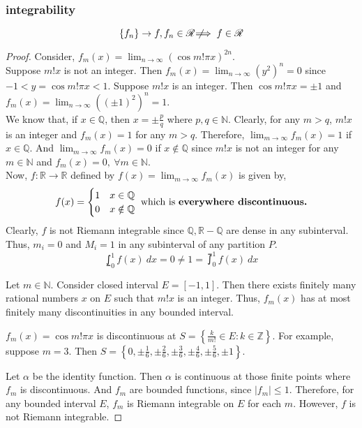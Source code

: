 \subsubsection{integrability} 
\[ \left\{f_n\right\} \to f, f_n \in \mathscr{R} \not\!\!\!\implies f \in \mathscr{R} \]
\begin{proof}
Consider, $\displaystyle f_m(x) = \lim_{n \to \infty} (\cos m!\pi x)^{2n}$.\\

Suppose $m!x$ is not an integer.
Then $\displaystyle f_m(x) = \lim_{n \to \infty} (y^2)^n = 0$ since $-1<y = \cos m! \pi x <1$.
Suppose $m!x$ is an integer.
Then $\cos m! \pi x = \pm 1$ and $\displaystyle f_m(x) = \lim_{n \to \infty} ((\pm 1)^2)^n = 1$.\\

We know that, if $x \in \mathbb{Q}$, then $x = \pm \frac{p}{q}$ where $p,q \in \mathbb{N}$.
Clearly, for any $m > q$, $m! x$ is an integer and $f_m(x) =1 $ for any $m > q$.
Therefore, $\displaystyle \lim_{m \to \infty} f_m(x) = 1$ if $x \in \mathbb{Q}$.
And $\displaystyle \lim_{m \to \infty} f_m(x) = 0$ if $x \notin \mathbb{Q}$ since $m! x$ is not an integer for any $m \in \mathbb{N}$ and $f_m(x) = 0,\ \forall m \in \mathbb{N}$.\\

Now, $f : \mathbb{R} \to \mathbb{R}$ defined by $\displaystyle f(x) = \lim_{m \to \infty} f_m(x)$ is given by,
	\[ f(x) = \begin{cases} 1 & x \in \mathbb{Q} \\ 0 & x \notin \mathbb{Q} \end{cases} \text{ which is \textbf{everywhere discontinuous.}} \]
	Clearly, $f$ is not Riemann integrable since $\mathbb{Q}, \mathbb{R}-\mathbb{Q}$ are dense in any subinterval.
	Thus, $m_i = 0$ and $M_i = 1$ in any subinterval of any partition $P$.
	\[ \lowint_0^1 f(x)\ dx = 0 \ne 1 = \upint_0^1 f(x)\ dx \]

\begin{important}
Let $m \in \mathbb{N}$.
Consider closed interval $E = [-1,1]$.
Then there exists finitely many rational numbers $x$ on $E$ such that $m!x$ is an integer.
Thus, $f_m(x)$ has at most finitely many discontinuities in any bounded interval. 
\end{important}
\begin{commentary}
$f_m(x) = \cos m! \pi x$ is discontinuous at $S = \left\{ \frac{k}{m!} \in E : k \in \mathbb{Z} \right\}$.
For example, suppose $m = 3$.
Then $S = \left\{ 0,\pm\frac{1}{6},\pm\frac{2}{6},\pm\frac{3}{6},\pm\frac{4}{6},\pm\frac{5}{6},\pm 1 \right\}$.
\end{commentary}
Let $\alpha$ be the identity function.
Then $\alpha$ is continuous at those finite points where $f_m$ is discontinuous.
And $f_m$ are bounded functions, since $|f_m| \le 1$.
Therefore, for any bounded interval $E$, $f_m$ is Riemann integrable on $E$ for each $m$.
However, $f$ is not Riemann integrable.
\end{proof}
